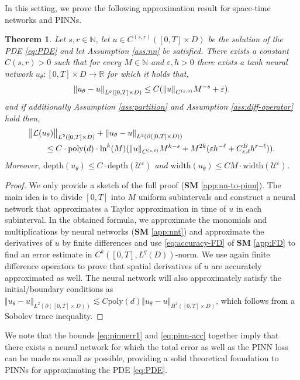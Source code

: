 \documentclass{article}
\numberwithin{equation}{section}
\newcommand{\poly}{\mathrm{poly}}
\newcommand{\width}{\mathrm{width}}
\newcommand{\depth}{\mathrm{depth}}
\newcommand{\R}{\mathbb{R}}
\newcommand{\N}{\mathbb{N}}
\newcommand{\cL}{\mathcal{L}}
\newcommand{\cU}{\mathcal{U}}
\renewcommand{\epsilon}{\varepsilon}
\newcommand{\1}{\mathbbm{1}}
\newtheorem{theorem}{Theorem}[section]
\begin{document}
In this setting, we prove the following approximation result for space-time networks and PINNs.
\begin{theorem}\label{thm:nn-to-pinn}
Let $s,r\in\N$, let $u\in C^{(s,r)}([0,T]\times D)$ be the solution of the PDE \eqref{eq:PDE} and let Assumption \ref{ass:nn} be satisfied. There exists a constant $C(s,r)>0$ such that for every $M\in\N$ and $\epsilon, h>0$ there exists a tanh neural network $u_\theta:[0,T]\times D\to \R$ for which it holds that,
\begin{equation}
\label{eq:pinnerr1}
    \norm{u_\theta-u}_{L^q([0,T]\times D)} \leq C(\norm{u}_{C^{(s,0)}}M^{-s}+\epsilon). 
\end{equation}
and if additionally Assumption \ref{ass:partition} and Assumption \ref{ass:diff-operator} hold then,
\begin{equation}\label{eq:pinn-acc}
\begin{split}
     &\norm{\cL(u_\theta)}_{L^2([0,T]\times D)} + \norm{u_\theta-u}_{L^2(\partial([0,T]\times D))} \\
     &\qquad \leq C\cdot \poly(d)\cdot \ln^k(M)(\norm{u}_{C^{(s,\ell)}}M^{k-s}+M^{2k}(\epsilon h^{-\ell}+C^B_{\epsilon,\ell}h^{r-\ell})). 
\end{split}
\end{equation}
Moreover, $\depth(u_\theta)\leq C\cdot\depth(\cU^\epsilon)$ and $\width(u_\theta) \leq CM\cdot \width(\cU^\epsilon)$. 
\end{theorem}

\begin{proof}
We only provide a sketch of the full proof (\textbf{SM} \ref{app:nn-to-pinn}). The main idea is to divide $[0,T]$ into $M$ uniform subintervals and construct a neural network that approximates a Taylor approximation in time of $u$ in each subinterval. In the obtained formula, we approximate the monomials and multiplications by neural networks (\textbf{SM} \ref{app:nnt}) and approximate the derivatives of $u$ by finite differences and use \eqref{eq:accuracy-FD} of \textbf{SM} \ref{app:FD} to find an error estimate in $C^k([0,T], L^q(D))$-norm. We use again finite difference operators to prove that spatial derivatives of $u$ are accurately approximated as well. The neural network will also approximately satisfy the initial/boundary conditions as $\Vert u_\theta-u\Vert_{L^2(\partial([0,T]\times D))} \lesssim C \poly(d) \Vert u_\theta-u\Vert_{H^1([0,T]\times D)}$, which follows from a Sobolev trace inequality. 
\end{proof}
We note that the bounds \eqref{eq:pinnerr1} and \eqref{eq:pinn-acc} together imply that there exists a neural network for which the total error as well as the PINN loss can be made as small as possible, providing a solid theoretical foundation to PINNs for approximating the PDE \eqref{eq:PDE}. 
\end{document}
